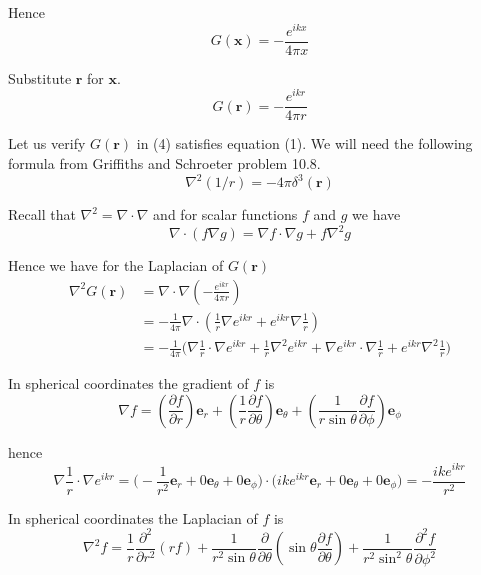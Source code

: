 Hence
\begin{equation*}
G(\mathbf x)=-\frac{e^{ikx}}{4\pi x}
\end{equation*}

Substitute $\mathbf r$ for $\mathbf x$.
\begin{equation*}
G(\mathbf r)=-\frac{e^{ikr}}{4\pi r}
\tag{4}
\end{equation*}

Let us verify $G(\mathbf r)$ in (4) satisfies equation (1).
We will need the following formula from Griffiths and Schroeter problem 10.8.
\begin{equation*}
\nabla^2(1/r)=-4\pi\delta^3(\mathbf r)
\tag{5}
\end{equation*}

Recall that $\nabla^2=\nabla\cdot\nabla$ and for scalar functions
$f$ and $g$ we have
\begin{equation*}
\nabla\cdot(f\nabla g)=\nabla f\cdot\nabla g+f\nabla^2g
\end{equation*}

Hence we have for the Laplacian of $G(\mathbf r)$
\begin{align*}
\nabla^2G(\mathbf r)
&=\nabla\cdot\nabla\left(-\frac{e^{ikr}}{4\pi r}\right)
\\
&=-\frac{1}{4\pi}\nabla\cdot\left(\frac{1}{r}\nabla e^{ikr}+e^{ikr}\nabla\frac{1}{r}\right)
\\
&=-\frac{1}{4\pi}\biggl(
\nabla\frac{1}{r}\cdot\nabla e^{ikr}
+\frac{1}{r}\nabla^2e^{ikr}
+\nabla e^{ikr}\cdot\nabla\frac{1}{r}
+e^{ikr}\nabla^2\frac{1}{r}
\biggr)
\tag{6}
\end{align*}

In spherical coordinates the gradient of $f$ is
\begin{equation*}
\nabla f=\left(\frac{\partial f}{\partial r}\right)\mathbf e_r
+\left(\frac{1}{r}\frac{\partial f}{\partial\theta}\right)\mathbf e_\theta
+\left(\frac{1}{r\sin\theta}\frac{\partial f}{\partial\phi}\right)\mathbf e_\phi
\end{equation*}

hence
\begin{equation*}
\nabla\frac{1}{r}\cdot\nabla e^{ikr}
=\biggl(-\frac{1}{r^2}\mathbf e_r+0\mathbf e_\theta+0\mathbf e_\phi\biggr)
\cdot
\biggl(ike^{ikr}\mathbf e_r+0\mathbf e_\theta+0\mathbf e_\phi\biggr)
=-\frac{ike^{ikr}}{r^2}
\tag{7}
\end{equation*}

In spherical coordinates the Laplacian of $f$ is
\begin{equation*}
\nabla^2f=\frac{1}{r}\frac{\partial^2}{\partial r^2}(rf)
+\frac{1}{r^2\sin\theta}\frac{\partial}{\partial\theta}
\left(\sin\theta\frac{\partial f}{\partial\theta}\right)
+\frac{1}{r^2\sin^2\theta}\frac{\partial^2f}{\partial\phi^2}
\end{equation*}


